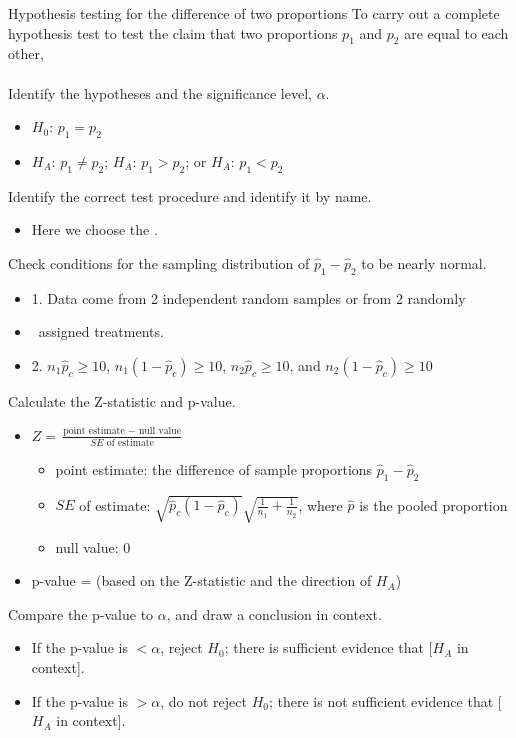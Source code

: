  

\begin{onebox}{Hypothesis testing for the difference of two proportions}
To carry out a complete hypothesis test to test the claim that two proportions $p_1$ and $p_2$ are equal to each other,
\\
\\
 Identify the hypotheses and the significance level, $\alpha$.
\begin{itemize}\vspace{-1mm}
\setlength{\itemsep}{0mm}
\item[] $H_0$: $p_1=p_2$ 
\item[] $H_A$: $p_1\ne p_2$; \quad $H_A$: $p_1>p_2$; \quad or \quad $H_A$: $p_1<p_2$ 
\end{itemize}
  Identify the correct test procedure and identify it by name.\vspace{-1mm}
\begin{itemize}
\item[] Here we choose the .
\end{itemize}
  Check conditions for the sampling distribution of $\hat{p}_1-\hat{p}_2$ to be nearly normal.\vspace{-1mm}
\begin{itemize}
\setlength{\itemsep}{0mm}
\item[] 1.  Data come from 2 independent random samples or from 2 randomly
\item[] \quad \  assigned treatments.
\item[] 2.  $n_1\hat{p}_c\geq 10$, $n_1(1-\hat{p}_c)\geq 10$, $n_2\hat{p}_c\geq 10$, and $n_2(1-\hat{p}_c)\geq 10$
\end{itemize}
   Calculate the Z-statistic and p-value.
\begin{itemize}
\item[] $Z = \frac{\text{point estimate } - \text{ null value}}{SE \text{ of estimate}}$
\begin{itemize}
\item[] point estimate: the difference of sample proportions $\hat{p}_1 - \hat{p}_2$
\item[] $SE$ of estimate:  $\sqrt{\hat{p}_c(1-\hat{p}_c)}\sqrt{\frac{1}{n_1} + \frac{1}{n_2}}$, where $\hat{p}$ is the pooled proportion
\item[] null value: 0
\end{itemize}
\item[] p-value = (based on the Z-statistic and the direction of $H_A$)
\end{itemize}
  Compare the p-value to $\alpha$, and draw a conclusion in context.\vspace{-1mm}
\begin{itemize}
\item[] If the p-value is $< \alpha$, reject $H_0$; there is sufficient evidence that [$H_A$ in context]. 
\item[] If the p-value is $> \alpha$, do not reject $H_0$; there is not sufficient evidence that [$H_A$ in context].
\end{itemize}\end{onebox}


